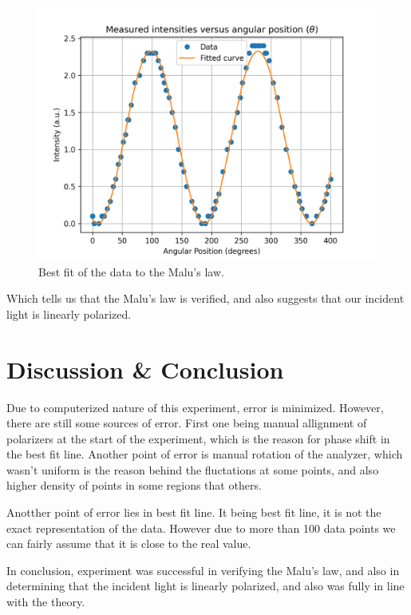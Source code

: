 \documentclass[10pt]{article}
\begin{document}
\begin{figure}[ht]
  \centering
  \includegraphics[scale=0.6]{plots/plot2.png}
  \caption{Best fit of the data to the Malu's law.}
  \label{fig:3}
\end{figure}
Which tells us that the Malu's law is verified, and also suggests that our incident light is linearly polarized.
 
\section{Discussion \& Conclusion}
Due to computerized nature of this experiment, error is minimized. However, there are still some sources of error. First one being manual allignment of polarizers at the start of the experiment, which is the reason for phase shift in the best fit line. Another point of error is manual rotation of the analyzer, which wasn't uniform is the reason behind the fluctations at some points, and also higher density of points in some regions that others.

Anotther point of error lies in best fit line. It being best fit line, it is not the exact representation of the data. However due to more than 100 data points we can fairly assume that it is close to the real value.

In conclusion, experiment was successful in verifying the Malu's law, and also in determining that the incident light is linearly polarized, and also was fully in line with the theory.
\printbibliography
\end{document}
